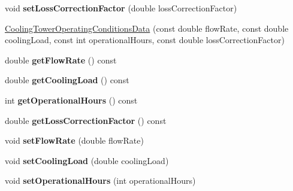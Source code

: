 \begin{DoxyCompactItemize}
void {\bfseries set\+Loss\+Correction\+Factor} (double loss\+Correction\+Factor)
\item 
\hyperlink{class_cooling_tower_operating_conditions_data_a51e6445c137db249bdc8d02ff1e1b7ff}{Cooling\+Tower\+Operating\+Conditions\+Data} (const double flow\+Rate, const double cooling\+Load, const int operational\+Hours, const double loss\+Correction\+Factor)
\item 
\mbox{\label{class_cooling_tower_operating_conditions_data_a6f61a2d4acaeedb86d534657c5fd8de6}} 
double {\bfseries get\+Flow\+Rate} () const
\item 
\mbox{\label{class_cooling_tower_operating_conditions_data_a3557f2c4d06aef39d8296438d0261b85}} 
double {\bfseries get\+Cooling\+Load} () const
\item 
\mbox{\label{class_cooling_tower_operating_conditions_data_a972d60974ad3d3cfb52068e6dbd27407}} 
int {\bfseries get\+Operational\+Hours} () const
\item 
\mbox{\label{class_cooling_tower_operating_conditions_data_ac071130167f5137c485f4ca9c60d1f78}} 
double {\bfseries get\+Loss\+Correction\+Factor} () const
\item 
\mbox{\label{class_cooling_tower_operating_conditions_data_a179ec1a769718787f3acc645624717c6}} 
void {\bfseries set\+Flow\+Rate} (double flow\+Rate)
\item 
\mbox{\label{class_cooling_tower_operating_conditions_data_a42559352dc04a59ce0b9f50dd1591e84}} 
void {\bfseries set\+Cooling\+Load} (double cooling\+Load)
\item 
\mbox{\label{class_cooling_tower_operating_conditions_data_a77c481059c024d9606d9d88426557162}} 
void {\bfseries set\+Operational\+Hours} (int operational\+Hours)
\item 
\mbox{\label{class_cooling_tower_operating_conditions_data_ac858a4d26003900b8cd9c53e257f6009}} 

\end{DoxyCompactItemize}

